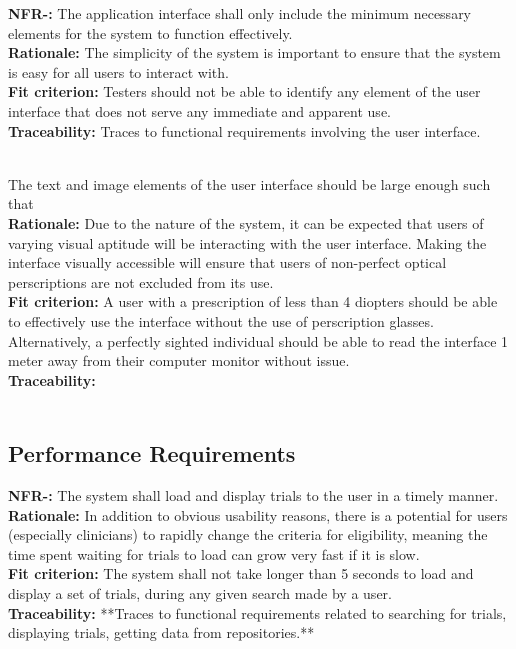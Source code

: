 \documentclass[12pt, titlepage]{article}
\newcounter{NFR_Counter}
\newcounter{FR_Counter}
\begin{document}
\noindent\textbf{NFR-\the\value{NFR_Counter}:}
The application interface shall only include the minimum necessary elements for the system to function effectively. \\
\textbf{Rationale:}
The simplicity of the system is important to ensure that the system is easy for all users to interact with. \\
\textbf{Fit criterion:}
Testers should not be able to identify any element of the user interface that does not serve any immediate and apparent use. \\
\textbf{Traceability:}
Traces to functional requirements involving the user interface. \\~\\
\addtocounter{NFR_Counter}{1}

The text and image elements of the user interface should be large enough such that  \\
\textbf{Rationale:}
Due to the nature of the system, it can be expected that users of varying visual aptitude will be interacting with the user interface. Making the interface visually accessible will ensure that users of non-perfect optical perscriptions are not excluded from its use. \\
\textbf{Fit criterion:}
A user with a prescription of less than 4 diopters should be able to effectively use the interface without the use of perscription glasses. Alternatively, a perfectly sighted individual should be able to read the interface 1 meter away from their computer monitor without issue. \\
\textbf{Traceability:}
 \\~\\
\addtocounter{NFR_Counter}{1}


\subsection{Performance Requirements}

\textbf{NFR-\the\value{NFR_Counter}:}
The system shall load and display trials to the user in a timely manner.\\
\textbf{Rationale:}
In addition to obvious usability reasons, there is a potential for users (especially clinicians) to rapidly
change the criteria for eligibility, meaning the time spent waiting for trials to load can grow very fast if it is slow.\\
\textbf{Fit criterion:}
The system shall not take longer than 5 seconds to load and display a set of trials, during any given search made by a user.\\
\textbf{Traceability:}
**Traces to functional requirements related to searching for trials, displaying trials, getting data from repositories.** \\~\\
\addtocounter{NFR_Counter}{1}
\end{document}
